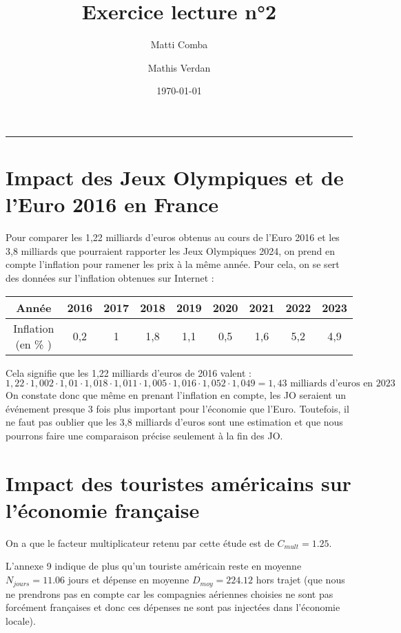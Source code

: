 \documentclass{article}
\title{Exercice lecture n°2}
\author{Matti Comba \and Mathis Verdan}
\date{\today}
\begin{document}
\maketitle
\begin{center}
  \rule{\linewidth}{0.5mm}
\end{center}


\section{Impact des Jeux Olympiques et de l'Euro 2016 en France}
Pour comparer les 1,22 milliards d'euros obtenus au cours de l'Euro 2016 et les 3,8 milliards que pourraient rapporter les Jeux Olympiques 2024, on prend en compte l'inflation pour ramener les prix à la même année. Pour cela, on se sert des données sur l'inflation obtenues sur Internet : 

\begin{center}
    \begin{tabular}{ | c | c | c |  c |  c |  c |  c |  c |  c | }
      \hline
      Année & 2016 & 2017 & 2018 & 2019 & 2020 & 2021 & 2022 & 2023 \\ \hline
      Inflation (en \% ) & 0,2 & 1 & 1,8 & 1,1 & 0,5 & 1,6 & 5,2 & 4,9 \\ \hline
    \end{tabular}
\end{center}

Cela signifie que les 1,22 milliards d'euros de 2016 valent :
$$ 1,22 \cdot 1,002 \cdot 1,01 \cdot 1,018 \cdot 1,011 \cdot 1,005 \cdot 1,016 \cdot 1,052 \cdot 1,049 = 1,43 \text{ milliards d'euros en 2023}$$
On constate donc que même en prenant l'inflation en compte, les JO seraient un événement presque 3 fois plus important pour l'économie que l'Euro. Toutefois, il ne faut pas oublier que les 3,8 milliards d'euros sont une estimation et que nous pourrons faire une comparaison précise seulement à la fin des JO.

\section{Impact des touristes américains sur l'économie française}
  
  On a que le facteur multiplicateur retenu par cette étude est de $ C_{mult} = 1.25$. 
  
  L'annexe 9 indique de plus qu'un touriste américain reste en moyenne $N_{jours} = 11.06$ jours et dépense en moyenne $D_{moy}=224.12 $ \texteuro hors trajet (que nous ne prendrons pas en compte car les compagnies aériennes choisies ne sont pas forcément françaises et donc ces dépenses ne sont pas injectées dans l'économie locale).
\end{document}
